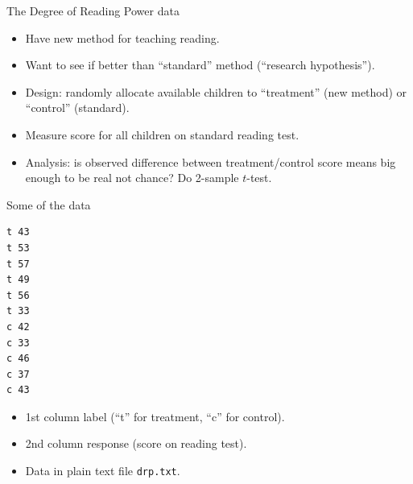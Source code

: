 \begin{frame}{The Degree of Reading Power data}

  \begin{itemize}
  \item Have new method for teaching reading.
  \item Want to see if better than ``standard'' method (``research hypothesis'').
  \item Design: randomly allocate available children to ``treatment''
    (new method) or ``control'' (standard).
  \item Measure score for all children on standard reading test.
  \item Analysis: is observed difference between treatment/control score
    means big enough to be real not chance? Do 2-sample $t$-test.
  \end{itemize}

\end{frame}

\begin{frame}[fragile]{Some of the data}

\begin{verbatim}
t 43
t 53
t 57
t 49
t 56
t 33
c 42
c 33
c 46
c 37
c 43
\end{verbatim}

  \begin{itemize}
  \item 1st column label (``t'' for treatment, ``c'' for control).
  \item 2nd column response (score on reading test).
  \item Data in plain text file \verb-drp.txt-.

  \end{itemize}
  
\end{frame}


